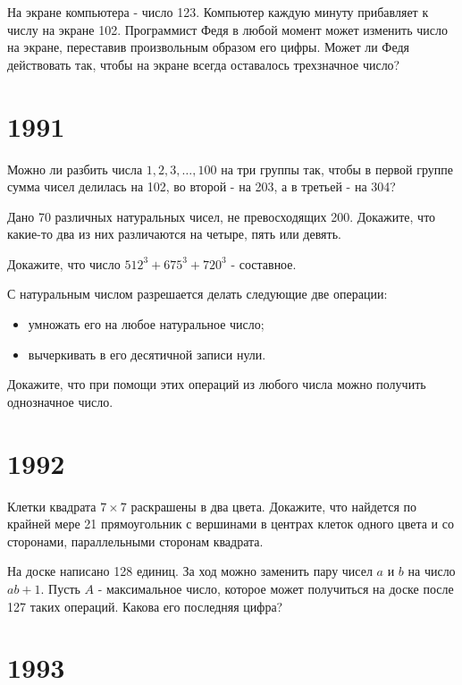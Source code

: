 \documentclass[11pt, a4paper]{template}
\begin{document}
\begin{exercise}
На экране компьютера - число 123. Компьютер каждую минуту прибавляет к числу на экране 102. Программист Федя в любой момент может изменить число на экране, переставив произвольным образом его цифры. Может ли Федя действовать так, чтобы на экране всегда оставалось трехзначное число?
\end{exercise}

\chapter{1991}

\begin{exercise}
Можно ли разбить числа $1, 2, 3, \dots, 100$ на три группы так, чтобы в первой группе сумма чисел делилась на 102, во второй - на 203, а в третьей - на 304?
\end{exercise}

\begin{exercise}
Дано 70 различных натуральных чисел, не превосходящих 200. Докажите, что какие-то два из них различаются на четыре, пять или девять.
\end{exercise}

\begin{exercise}
Докажите, что число $512^{3} + 675^{3} + 720^{3}$ - составное.
\end{exercise}

\begin{exercise}
С натуральным числом разрешается делать следующие две операции:
\begin{itemize}
\item умножать его на любое натуральное число;
\item вычеркивать в его десятичной записи нули.
\end{itemize}
Докажите, что при помощи этих операций из любого числа можно получить однозначное число.
\end{exercise}

\chapter{1992}

\begin{exercise}
Клетки квадрата $7 \times 7$ раскрашены в два цвета. Докажите, что найдется по крайней мере 21 прямоугольник с вершинами в центрах клеток одного цвета и со сторонами, параллельными сторонам квадрата.
\end{exercise}

\begin{exercise}
На доске написано 128 единиц. За ход можно заменить пару чисел $a$ и $b$ на число $ab+1$. Пусть $A$ - максимальное число, которое может получиться на доске после 127 таких операций. Какова его последняя цифра?
\end{exercise}

\chapter{1993}
\end{document}
